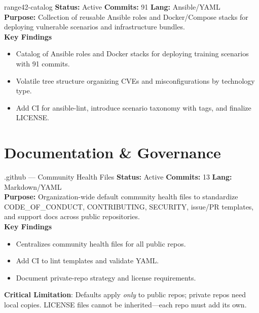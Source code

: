 \documentclass[aspectratio=169]{beamer}
\begin{document}
\begin{frame}{range42-catalog \; \faBoxes}
  \textbf{Status:} Active \hfill \textbf{Commits:} 91 \hfill \textbf{Lang:} Ansible/YAML\\[2mm]
  \textbf{Purpose:} Collection of reusable Ansible roles and Docker/Compose stacks for deploying vulnerable scenarios and infrastructure bundles.\\[2mm]
  \textbf{Key Findings}
  \begin{itemize}
    \item Catalog of Ansible roles and Docker stacks for deploying training scenarios with 91 commits.
    \item Volatile tree structure organizing CVEs and misconfigurations by technology type.
    \item Add CI for ansible-lint, introduce scenario taxonomy with tags, and finalize LICENSE.
  \end{itemize}
\end{frame}

\section{Documentation \& Governance}

\begin{frame}{.github — Community Health Files \; \faUsers}
  \textbf{Status:} Active \hfill \textbf{Commits:} 13 \hfill \textbf{Lang:} Markdown/YAML\\[2mm]
  \textbf{Purpose:} Organization-wide default community health files to standardize CODE\_OF\_CONDUCT, CONTRIBUTING, SECURITY, issue/PR templates, and support docs across public repositories.\\[2mm]
  \textbf{Key Findings}
  \begin{itemize}
    \item Centralizes community health files for all public repos.
    \item Add CI to lint templates and validate YAML.
    \item Document private-repo strategy and license requirements.
  \end{itemize}
  \begin{tcolorbox}
    \faExclamationTriangle\; \textbf{Critical Limitation}: Defaults apply \emph{only} to public repos; private repos need local copies. LICENSE files cannot be inherited—each repo must add its own.
  \end{tcolorbox}
\end{frame}
\end{document}
